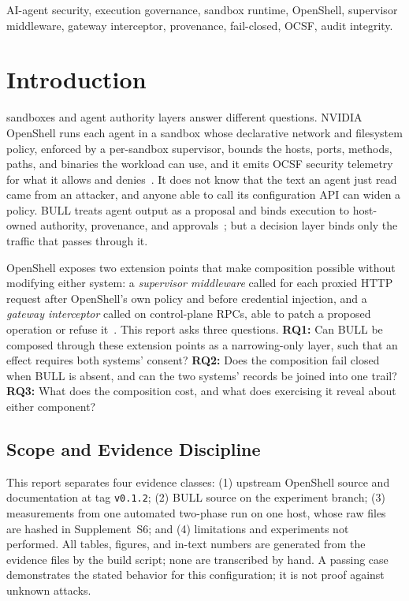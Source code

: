 \documentclass[journal]{IEEEtran}
\newcommand{\bull}{\textsc{BULL}}
\newcommand{\openshell}{OpenShell}
\begin{document}
\begin{IEEEkeywords}
AI-agent security, execution governance, sandbox runtime, OpenShell, supervisor middleware, gateway interceptor, provenance, fail-closed, OCSF, audit integrity.
\end{IEEEkeywords}

\section{Introduction}
 sandboxes and agent authority layers answer different questions. NVIDIA \openshell{} runs each agent in a sandbox whose declarative network and filesystem policy, enforced by a per-sandbox supervisor, bounds the hosts, ports, methods, paths, and binaries the workload can use, and it emits OCSF security telemetry for what it allows and denies~\cite{OS_Repo,OS_Logging}. It does not know that the text an agent just read came from an attacker, and anyone able to call its configuration API can widen a policy. \bull{} treats agent output as a proposal and binds execution to host-owned authority, provenance, and approvals~\cite{BULL_Report}; but a decision layer binds only the traffic that passes through it.

\openshell{} exposes two extension points that make composition possible without modifying either system: a \emph{supervisor middleware} called for each proxied HTTP request after \openshell{}'s own policy and before credential injection, and a \emph{gateway interceptor} called on control-plane RPCs, able to patch a proposed operation or refuse it~\cite{OS_MiddlewareDoc,OS_InterceptorDoc}. This report asks three questions. \textbf{RQ1:} Can \bull{} be composed through these extension points as a narrowing-only layer, such that an effect requires both systems' consent? \textbf{RQ2:} Does the composition fail closed when \bull{} is absent, and can the two systems' records be joined into one trail? \textbf{RQ3:} What does the composition cost, and what does exercising it reveal about either component?

\subsection{Scope and Evidence Discipline}
This report separates four evidence classes: (1) upstream \openshell{} source and documentation at tag \texttt{v0.1.2}; (2) \bull{} source on the experiment branch; (3) measurements from one automated two-phase run on one host, whose raw files are hashed in Supplement~S6; and (4) limitations and experiments not performed. All tables, figures, and in-text numbers are generated from the evidence files by the build script; none are transcribed by hand. A passing case demonstrates the stated behavior for this configuration; it is not proof against unknown attacks.
\end{document}
